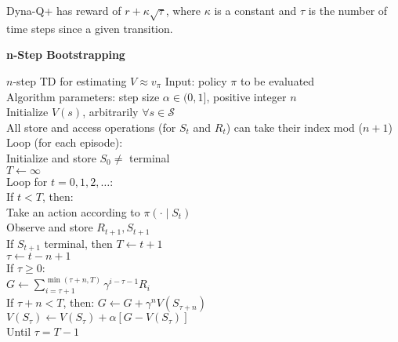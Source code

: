 \documentclass[twocolumn]{article}
\begin{document}
Dyna-Q+ has reward of $r + \kappa \sqrt{\tau}$, where $\kappa$ is a constant and $\tau$ is the number of time steps since a given transition.

\vspace{-.5em}
\dotfill

\textbf{n-Step Bootstrapping}

\begin{mydef}{$n$-step TD for estimating $V \approx v_\pi$}{}
    Input: policy $\pi$ to be evaluated \\
    Algorithm parameters: step size $\alpha \in (0, 1]$, positive integer $n$ \\
    Initialize $V(s)$, arbitrarily $\forall s \in \mathcal S$ \\
    All store and access operations (for $S_t$ and $R_t$) can take their index mod ($n+1$) \\
    
    Loop (for each episode): \\
        \hspace*{2em}Initialize and store $S_0 \neq$ terminal \\
        \hspace*{2em}$T \leftarrow \infty$ \\
        \hspace*{2em}Loop for $t=0,1,2,\dots$: \\
            \hspace*{4em}If $t < T$, then: \\
                \hspace*{6em}Take an action according to $\pi(\cdot \mid S_t)$ \\
                \hspace*{6em}Observe and store $R_{t+1}, S_{t+1}$ \\
                \hspace*{6em}If $S_{t+1}$ terminal, then $T \leftarrow t+1$ \\
            \hspace*{4em}$\tau \leftarrow t-n+1$ \\
            \hspace*{4em}If $\tau \geq 0$: \\
                \hspace*{6em}$G \leftarrow \sum_{i=\tau+1}^{\min (\tau+n, T)} \gamma^{i-\tau-1} R_i$ \\
                \hspace*{6em}If $\tau + n < T$, then: $G \leftarrow G + \gamma^n V(S_{\tau+n})$ \\
                \hspace*{6em}$V(S_\tau) \leftarrow V(S_\tau) + \alpha [G-V(S_\tau)]$ \\
        \hspace*{2em}Until $\tau=T-1$
\end{mydef}
\end{document}

